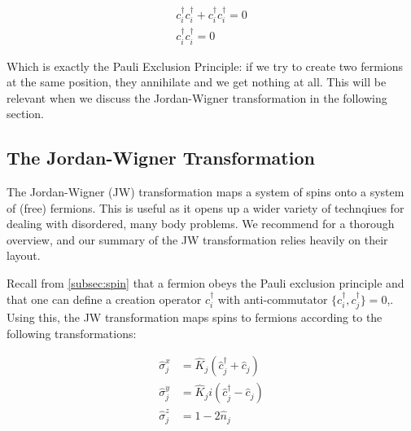 \begin{gather}
	c_i^\dagger c_i^\dagger + c_i^\dagger c_i^\dagger = 0 \\
	c_i^\dagger c_i^\dagger = 0
\end{gather}

Which is exactly the Pauli Exclusion Principle: if we try to create two fermions at the same position, they annihilate and we get nothing at all. This will be relevant when we discuss the Jordan-Wigner transformation in the following section.


\subsection{The Jordan-Wigner Transformation}\label{subsec:jw_transform}
The Jordan-Wigner (JW) transformation maps a system of spins onto a system of (free) fermions. This is useful as it opens up a wider variety of technqiues for dealing with disordered, many body problems. We recommend \cite{quantum_ising_beginners} for a thorough overview, and our summary of the JW transformation relies heavily on their layout. 

Recall from \ref{subsec:spin} that a fermion obeys the Pauli exclusion principle and that one can define a creation operator $c_i^\dagger$ with anti-commutator $\{c_i^\dagger, c_j^\dagger\} = 0$,. Using this, the JW transformation maps spins to fermions according to the following transformations: 

\begin{align}
	\hat{\sigma}_j^x &=\hat{K}_j\left(\hat{c}_j^{\dagger}+\hat{c}_j\right) \\
	\hat{\sigma}_j^y &=\hat{K}_j i\left(\hat{c}_j^{\dagger}-\hat{c}_j\right) \\
	\hat{\sigma}_j^z &=1-2 \hat{n}_j
\end{align}




